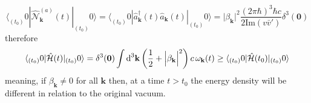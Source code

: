\begin{equation}
	\langle_{(t_0)}0|\hat{\mathcal{N}}_\mathbf{k}^{(a)}(t)|_{(t_0)}0\rangle=\langle_{(t_0)}0|\hat{a}^\dagger_\mathbf{k}(t)\hat{a}_\mathbf{k}(t)|_{(t_0)}0\rangle=\Big|\beta_\mathbf{k}\Big|^2\frac{(2\pi\hbar)^3\hbar c}{2\text{Im}(v\bar v')}\delta^3(\mathbf{0})
\end{equation}
therefore
\begin{equation}
	\langle_{(t_0)}0|\hat{\mathcal{H}}(t)|_{(t_0)}0\rangle=\delta^3(\mathbf{0})\int\text{d}^3\mathbf{k}\left(\frac{1}{2}+\Big|\beta_\mathbf{k}\Big|^2\right)c\,\omega_\mathbf{k}(t)\geq \langle_{(t_0)}0|\hat{\mathcal{H}}(t_0)|_{(t_0)}0\rangle
\end{equation}
meaning, if $\beta_\mathbf{k}\not=0$ for all $\mathbf{k}$ then, at a time $t>t_0$ the energy density will be different in relation to the original vacuum.